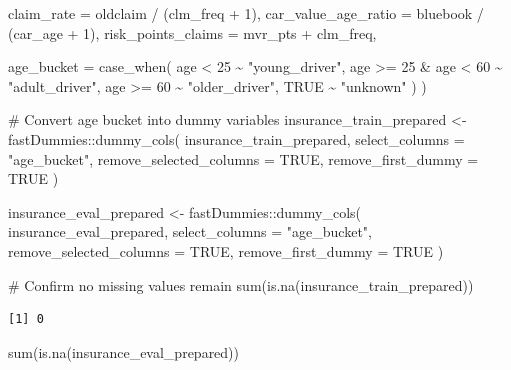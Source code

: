 \documentclass[
  11pt]{article}
\newenvironment{Shaded}{\begin{snugshade}}{\end{snugshade}}
\newcommand{\AttributeTok}[1]{\textcolor[rgb]{0.40,0.45,0.13}{#1}}
\newcommand{\CommentTok}[1]{\textcolor[rgb]{0.37,0.37,0.37}{#1}}
\newcommand{\ConstantTok}[1]{\textcolor[rgb]{0.56,0.35,0.01}{#1}}
\newcommand{\DecValTok}[1]{\textcolor[rgb]{0.68,0.00,0.00}{#1}}
\newcommand{\FunctionTok}[1]{\textcolor[rgb]{0.28,0.35,0.67}{#1}}
\newcommand{\NormalTok}[1]{\textcolor[rgb]{0.00,0.23,0.31}{#1}}
\newcommand{\OtherTok}[1]{\textcolor[rgb]{0.00,0.23,0.31}{#1}}
\newcommand{\SpecialCharTok}[1]{\textcolor[rgb]{0.37,0.37,0.37}{#1}}
\newcommand{\StringTok}[1]{\textcolor[rgb]{0.13,0.47,0.30}{#1}}
\begin{document}
\begin{Shaded}
\begin{Highlighting}[]
    \AttributeTok{claim\_rate =}\NormalTok{ oldclaim }\SpecialCharTok{/}\NormalTok{ (clm\_freq }\SpecialCharTok{+} \DecValTok{1}\NormalTok{),}
    \AttributeTok{car\_value\_age\_ratio =}\NormalTok{ bluebook }\SpecialCharTok{/}\NormalTok{ (car\_age }\SpecialCharTok{+} \DecValTok{1}\NormalTok{),}
    \AttributeTok{risk\_points\_claims =}\NormalTok{ mvr\_pts }\SpecialCharTok{+}\NormalTok{ clm\_freq,}

    \AttributeTok{age\_bucket =} \FunctionTok{case\_when}\NormalTok{(}
\NormalTok{      age }\SpecialCharTok{\textless{}} \DecValTok{25} \SpecialCharTok{\textasciitilde{}} \StringTok{"young\_driver"}\NormalTok{,}
\NormalTok{      age }\SpecialCharTok{\textgreater{}=} \DecValTok{25} \SpecialCharTok{\&}\NormalTok{ age }\SpecialCharTok{\textless{}} \DecValTok{60} \SpecialCharTok{\textasciitilde{}} \StringTok{"adult\_driver"}\NormalTok{,}
\NormalTok{      age }\SpecialCharTok{\textgreater{}=} \DecValTok{60} \SpecialCharTok{\textasciitilde{}} \StringTok{"older\_driver"}\NormalTok{,}
      \ConstantTok{TRUE} \SpecialCharTok{\textasciitilde{}} \StringTok{"unknown"}
\NormalTok{    )}
\NormalTok{  )}

\CommentTok{\# Convert age bucket into dummy variables}
\NormalTok{insurance\_train\_prepared }\OtherTok{\textless{}{-}}\NormalTok{ fastDummies}\SpecialCharTok{::}\FunctionTok{dummy\_cols}\NormalTok{(}
\NormalTok{  insurance\_train\_prepared,}
  \AttributeTok{select\_columns =} \StringTok{"age\_bucket"}\NormalTok{,}
  \AttributeTok{remove\_selected\_columns =} \ConstantTok{TRUE}\NormalTok{,}
  \AttributeTok{remove\_first\_dummy =} \ConstantTok{TRUE}
\NormalTok{)}

\NormalTok{insurance\_eval\_prepared }\OtherTok{\textless{}{-}}\NormalTok{ fastDummies}\SpecialCharTok{::}\FunctionTok{dummy\_cols}\NormalTok{(}
\NormalTok{  insurance\_eval\_prepared,}
  \AttributeTok{select\_columns =} \StringTok{"age\_bucket"}\NormalTok{,}
  \AttributeTok{remove\_selected\_columns =} \ConstantTok{TRUE}\NormalTok{,}
  \AttributeTok{remove\_first\_dummy =} \ConstantTok{TRUE}
\NormalTok{)}

\CommentTok{\# Confirm no missing values remain}
\FunctionTok{sum}\NormalTok{(}\FunctionTok{is.na}\NormalTok{(insurance\_train\_prepared))}
\end{Highlighting}
\end{Shaded}

\begin{verbatim}
[1] 0
\end{verbatim}

\begin{Shaded}
\begin{Highlighting}[]
\FunctionTok{sum}\NormalTok{(}\FunctionTok{is.na}\NormalTok{(insurance\_eval\_prepared))}
\end{Highlighting}
\end{Shaded}
\end{document}
